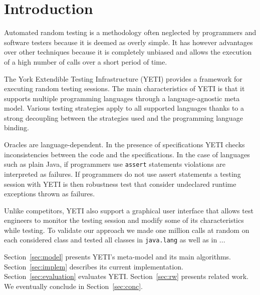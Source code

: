 \section{Introduction}\label{sec:intro}

Automated random testing is a methodology often neglected by 
programmers and software testers because it is deemed as overly
simple. It has however advantages over other techniques because 
it is completely unbiased and allows the execution of a high number 
of calls over a short period of time.


The York Extendible Testing Infrastructure (YETI) provides a framework 
for executing random testing sessions. The main characteristics of 
YETI is that it supports multiple programming languages through a 
language-agnostic meta model. Various testing strategies apply
to all supported languages thanks to a strong decoupling between the 
strategies used and the programming language binding. 

Oracles are language-dependent. In the presence of specifications YETI checks 
inconsistencies between the code and the specifications. In the case of 
languages such as plain Java, if programmers use \texttt{assert} statements 
violations are interpreted as failures. If programmers do not use assert 
statements a testing session with YETI is then  robustness test that
consider undeclared runtime exceptions thrown as failures.

Unlike competitors, YETI also support a graphical user interface that 
allows test engineers to monitor the testing session and modify some 
of its characteristics while testing. To validate our approach we made 
one million calls at random on each considered class and tested 
all classes in \texttt{java.lang} as well as in ...


Section~\ref{sec:model} presents YETI's meta-model and its main algorithms.
Section~\ref{sec:implem} describes its current implementation.
Section~\ref{sec:evaluation} evaluates YETI.
Section~\ref{sec:rw} presents related work.
We eventually conclude in Section~\ref{sec:conc}.